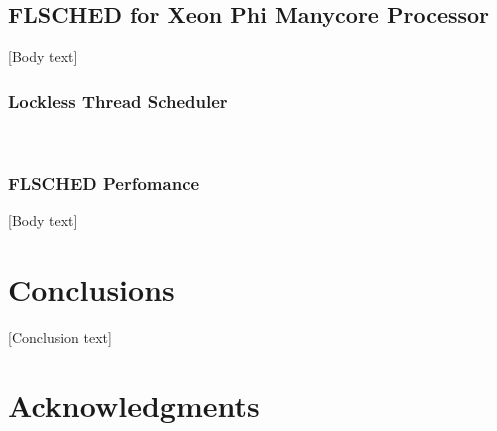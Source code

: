 \documentclass{sig-alternate}
\begin{document}
\subsection{FLSCHED for Xeon Phi Manycore Processor}
\label{sec:flsched}



[Body text]

\subsubsection{Lockless Thread Scheduler}
\label{sec:flsched_about}

\cite{Lozi:2016, HeeseungEtal:2017}
~\cite{KumarEtal:2014}

\subsubsection{FLSCHED Perfomance}
\label{sec:flsched_performance}

[Body text]

\section{Conclusions}
\label{sec:conclusions}

[Conclusion text]

\section*{Acknowledgments}
\label{sec:acknowledgments}



  
\end{document}
